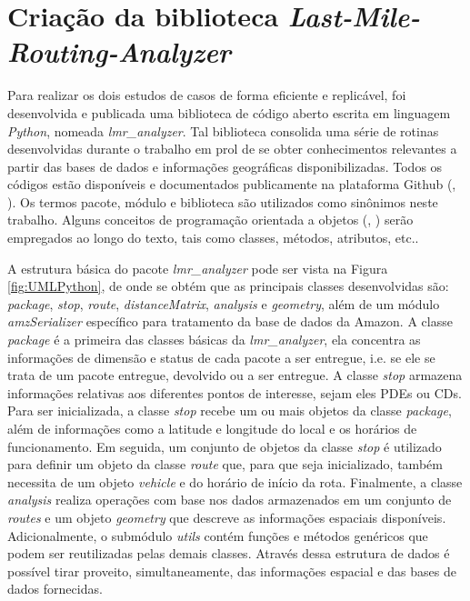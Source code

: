 \section{Criação da biblioteca \textit{Last-Mile-Routing-Analyzer}} \label{BibLMRA}

Para realizar os dois estudos de casos de forma eficiente e replicável, foi desenvolvida e publicada uma biblioteca de código aberto escrita em linguagem \textit{Python}, nomeada \textit{lmr\_analyzer}.
%
Tal biblioteca consolida uma série de rotinas desenvolvidas durante o trabalho em prol de se obter conhecimentos relevantes a partir das bases de dados e informações geográficas disponibilizadas.
%
Todos os códigos estão disponíveis e documentados publicamente na plataforma Github (, \citeyear{guilherme_fernandes_alves_2022_6792977}).
%
Os termos pacote, módulo e biblioteca são utilizados como sinônimos neste trabalho. 
Alguns conceitos de programação orientada a objetos (, \citeyear{cox1986object}) serão empregados ao longo do texto, tais como classes, métodos, atributos, etc.. 

A estrutura básica do pacote \textit{lmr\_analyzer} pode ser vista na Figura \ref{fig:UMLPython}, de onde se obtém que as principais classes desenvolvidas são: \textit{package}, \textit{stop}, \textit{route}, \textit{distanceMatrix}, \textit{analysis} e \textit{geometry}, além de um módulo \textit{amzSerializer} específico para tratamento da base de dados da Amazon.
%
A classe \textit{package} é a primeira das classes básicas da \textit{lmr\_analyzer}, ela concentra as informações de dimensão e status de cada pacote a ser entregue, i.e. se ele se trata de um pacote entregue, devolvido ou a ser entregue.
%
A classe \textit{stop} armazena informações relativas aos diferentes pontos de interesse, sejam eles PDEs ou CDs.
%
Para ser inicializada, a classe \textit{stop} recebe um ou mais objetos da classe \textit{package}, além de informações como a latitude e longitude do local e os horários de funcionamento.
%
Em seguida, um conjunto de objetos da classe \textit{stop} é utilizado para definir um objeto da classe \textit{route} que, para que seja inicializado, também necessita de um objeto \textit{vehicle} e do horário de início da rota.
%
Finalmente, a classe \textit{analysis} realiza operações com base nos dados armazenados em um conjunto de \textit{routes} e um objeto \textit{geometry} que descreve as informações espaciais disponíveis.
%
Adicionalmente, o submódulo \textit{utils} contém funções e métodos genéricos que podem ser reutilizadas pelas demais classes.
%
Através dessa estrutura de dados é possível tirar proveito, simultaneamente, das informações espacial e das bases de dados fornecidas. 

